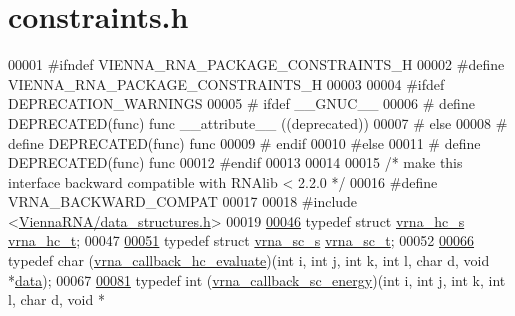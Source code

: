 \hypertarget{constraints_8h_source}{\section{constraints.\+h}
\label{constraints_8h_source}
}

\begin{DoxyCode}
00001 \textcolor{preprocessor}{#ifndef VIENNA\_RNA\_PACKAGE\_CONSTRAINTS\_H}
00002 \textcolor{preprocessor}{#define VIENNA\_RNA\_PACKAGE\_CONSTRAINTS\_H}
00003 
00004 \textcolor{preprocessor}{#ifdef DEPRECATION\_WARNINGS}
00005 \textcolor{preprocessor}{# ifdef \_\_GNUC\_\_}
00006 \textcolor{preprocessor}{#  define DEPRECATED(func) func \_\_attribute\_\_ ((deprecated))}
00007 \textcolor{preprocessor}{# else}
00008 \textcolor{preprocessor}{#  define DEPRECATED(func) func}
00009 \textcolor{preprocessor}{# endif}
00010 \textcolor{preprocessor}{#else}
00011 \textcolor{preprocessor}{# define DEPRECATED(func) func}
00012 \textcolor{preprocessor}{#endif}
00013 
00014 
00015 \textcolor{comment}{/* make this interface backward compatible with RNAlib < 2.2.0 */}
00016 \textcolor{preprocessor}{#define VRNA\_BACKWARD\_COMPAT}
00017 
00018 \textcolor{preprocessor}{#include <\hyperlink{data__structures_8h}{ViennaRNA/data\_structures.h}>}
00019 
\hypertarget{constraints_8h_source_l00046}{}\hyperlink{group__constraints_gac7e4c4f8abe3163a68110c5bff24e01d}{00046} \textcolor{keyword}{typedef} \textcolor{keyword}{struct  }\hyperlink{group__hard__constraints_structvrna__hc__s}{vrna\_hc\_s} \hyperlink{group__hard__constraints_structvrna__hc__s}{vrna\_hc\_t};
00047 
\hypertarget{constraints_8h_source_l00051}{}\hyperlink{group__constraints_ga75401ce219ef8dbcceb672db82d434c6}{00051} \textcolor{keyword}{typedef} \textcolor{keyword}{struct  }\hyperlink{group__soft__constraints_structvrna__sc__s}{vrna\_sc\_s} \hyperlink{group__soft__constraints_structvrna__sc__s}{vrna\_sc\_t};
00052 
\hypertarget{constraints_8h_source_l00066}{}\hyperlink{group__hard__constraints_gabe10e2b9d2498874bdfe0e0a4dffc246}{00066} \textcolor{keyword}{typedef} char (\hyperlink{group__hard__constraints_gabe10e2b9d2498874bdfe0e0a4dffc246}{vrna\_callback\_hc\_evaluate})(\textcolor{keywordtype}{int} i, \textcolor{keywordtype}{int} j, \textcolor{keywordtype}{int} k, \textcolor{keywordtype}{int} l, \textcolor{keywordtype}{char} d, \textcolor{keywordtype}{void} 
      *\hyperlink{group__soft__constraints_a7574680143df97b9029146c2150bf06d}{data});
00067 
\hypertarget{constraints_8h_source_l00081}{}\hyperlink{group__generalized__sc_ga2f3d2d2333e5a616e0f5cd4823780c0c}{00081} \textcolor{keyword}{typedef} int (\hyperlink{group__generalized__sc_ga2f3d2d2333e5a616e0f5cd4823780c0c}{vrna\_callback\_sc\_energy})(\textcolor{keywordtype}{int} i, \textcolor{keywordtype}{int} j, \textcolor{keywordtype}{int} k, \textcolor{keywordtype}{int} l, \textcolor{keywordtype}{char} d, \textcolor{keywordtype}{void} *

\end{DoxyCode}
